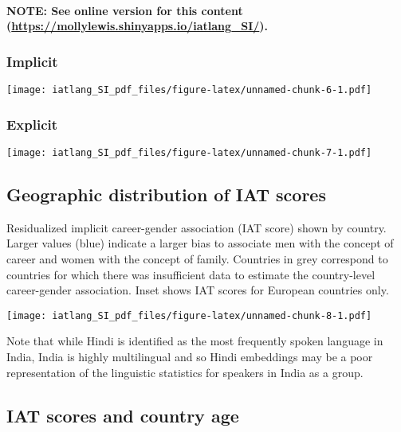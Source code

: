 \documentclass[]{article}
\let\oldparagraph\paragraph
\renewcommand{\paragraph}[1]{\oldparagraph{#1}\mbox{}}
\begin{document}
\hypertarget{note-see-online-version-for-this-content-httpsmollylewis.shinyapps.ioiatlang_si.}{%
\paragraph{\texorpdfstring{NOTE: See online version for this content
(\url{https://mollylewis.shinyapps.io/iatlang_SI/}).}{NOTE: See online version for this content (https://mollylewis.shinyapps.io/iatlang\_SI/).}}\label{note-see-online-version-for-this-content-httpsmollylewis.shinyapps.ioiatlang_si.}}

\hypertarget{implicit}{%
\subsubsection{Implicit}\label{implicit}}

\texttt{[image: iatlang\_SI\_pdf\_files/figure-latex/unnamed-chunk-6-1.pdf]}

\hypertarget{explicit}{%
\subsubsection{Explicit}\label{explicit}}

\texttt{[image: iatlang\_SI\_pdf\_files/figure-latex/unnamed-chunk-7-1.pdf]}

\hypertarget{geographic-distribution-of-iat-scores}{%
\subsection{Geographic distribution of IAT
scores}\label{geographic-distribution-of-iat-scores}}

Residualized implicit career-gender association (IAT score) shown by
country. Larger values (blue) indicate a larger bias to associate men
with the concept of career and women with the concept of family.
Countries in grey correspond to countries for which there was
insufficient data to estimate the country-level career-gender
association. Inset shows IAT scores for European countries only.

\texttt{[image: iatlang\_SI\_pdf\_files/figure-latex/unnamed-chunk-8-1.pdf]}

Note that while Hindi is identified as the most frequently spoken
language in India, India is highly multilingual and so Hindi embeddings
may be a poor representation of the linguistic statistics for speakers
in India as a group.

\hypertarget{iat-scores-and-country-age}{%
\subsection{IAT scores and country
age}\label{iat-scores-and-country-age}}
\end{document}
